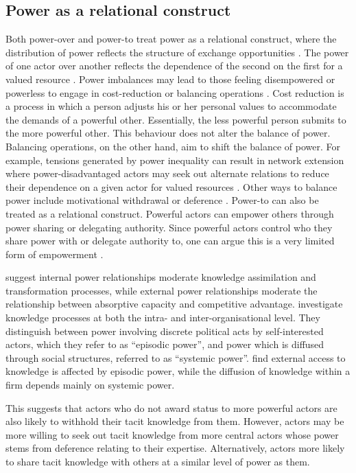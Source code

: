 \subsection{Power as a relational construct}

Both power-over and power-to treat power as a relational construct, where the distribution of power reflects the structure of exchange opportunities \citep{blau1964exchange,reagans2008knowledge,bonacich2009structural}. The power of one actor over another reflects the dependence of the second on the first for a valued resource \citep{emerson1962power}. Power imbalances may lead to those feeling disempowered or powerless to engage in cost-reduction or balancing operations \citep{emerson1962power}. Cost reduction is a process in which a person adjusts his or her personal values to accommodate the demands of a powerful other. Essentially, the less powerful person submits to the more powerful other. This behaviour does not alter the balance of power. Balancing operations, on the other hand, aim to shift the balance of power. For example, tensions generated by power inequality can result in network extension where power-disadvantaged actors may seek out alternate relations to reduce their dependence on a given actor for valued resources \citep{cook2013social}. Other ways to balance power include motivational withdrawal or deference \citep{emerson1962power}. Power-to can also be treated as a relational construct. Powerful actors can empower others through power sharing or delegating authority. Since powerful actors control who they share power with or delegate authority to, one can argue this is a very limited form of empowerment \citep{conger1988empowerment}. \medskip

\citet{todorova2007absorptive} suggest internal power relationships moderate knowledge assimilation and transformation processes, while external power relationships moderate the relationship between absorptive capacity and competitive advantage. \citet{easterby2008absorptive} investigate knowledge processes at both the intra- and inter-organisational level. They distinguish between power involving discrete political acts by self-interested actors, which they refer to as \enquote{episodic power}, and power which is diffused through social structures, referred to as \enquote{systemic power}. \citet{easterby2008absorptive} find external access to knowledge is affected by episodic power, while the diffusion of knowledge within a firm depends mainly on systemic power. \medskip

This suggests that actors who do not award status to more powerful actors are also likely to withhold their tacit knowledge from them. However, actors may be more willing to seek out tacit knowledge from more central actors whose power stems from deference relating to their expertise. Alternatively, actors more likely to share tacit knowledge with others at a similar level of power as them. \medskip


